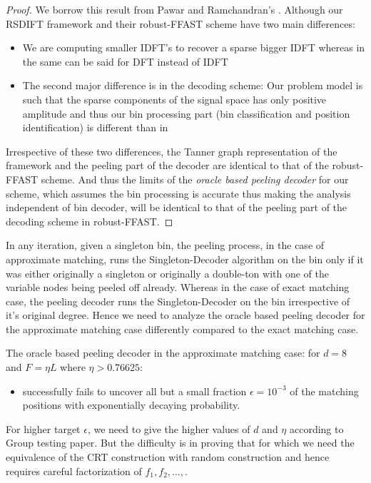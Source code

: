 \begin{proof}
We borrow this result from Pawar and Ramchandran's \cite{pawar2014robust}. Although our RSDIFT framework and their robust-FFAST scheme have two main differences: 
\begin{itemize}
\item We are computing smaller IDFT's to recover a sparse bigger IDFT whereas in \cite{pawar2014robust} the same can be said for  DFT instead of IDFT
\item The second major difference is in the decoding scheme: Our problem model is such that the sparse components of the signal space has only positive amplitude and thus our bin processing part (bin classification and position identification) is different than in \cite{pawar2014robust}
\end{itemize}
Irrespective of these two differences, the Tanner graph representation of the framework and the peeling part of the decoder are identical to that of the robust-FFAST scheme. And thus the limits of the {\it oracle based peeling decoder} for our scheme, which assumes the bin processing is accurate thus making the analysis independent of bin decoder, will be identical to that of the peeling part of the decoding scheme in robust-FFAST.
\end{proof}

In any iteration, given a singleton bin, the peeling process, in the case of approximate matching, runs the Singleton-Decoder algorithm on the bin only if it was either originally a singleton or originally a double-ton with one of the variable nodes being peeled off already. Whereas  in the case of exact matching case, the peeling decoder runs the Singleton-Decoder on the bin irrespective of it's original degree. Hence we need to analyze the oracle based peeling decoder for the approximate matching case differently compared to the exact matching case. 
\begin{lemma}
The oracle based peeling decoder in the approximate matching case: for $d=8$ and $F=\eta L$ where $\eta>0.76625$:
\begin{itemize}
\item successfully fails to uncover all but a small fraction $\epsilon=10^{-3}$ of the matching positions with exponentially decaying probability.
\end{itemize}
For higher target $\epsilon$, we need to give the higher values of $d$ and $\eta$ according to Group testing paper. But the difficulty is in proving that for which we need the equivalence of the CRT construction with random construction and hence requires careful factorization of $f_1,f_2,\ldots,$.
\end{lemma}
